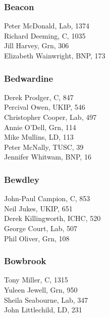\documentclass[a4paper,openany,10pt]{book}
\begin{document}
\subsubsection*{Beacon}



Peter McDonald, Lab, 1374\\
Richard Deeming, C, 1035\\
Jill Harvey, Grn, 306\\
Elizabeth Wainwright, BNP, 173\\


\subsubsection*{Bedwardine}



Derek Prodger, C, 847\\
Percival Owen, UKIP, 546\\
Christopher Cooper, Lab, 497\\
Annie O'Dell, Grn, 114\\
Mike Mullins, LD, 113\\
Peter McNally, TUSC, 39\\
Jennifer Whitwam, BNP, 16\\


\subsubsection*{Bewdley}



John-Paul Campion, C, 853\\
Neil Jukes, UKIP, 651\\
Derek Killingworth, ICHC, 520\\
George Court, Lab, 507\\
Phil Oliver, Grn, 108\\


\subsubsection*{Bowbrook}



Tony Miller, C, 1315\\
Yuleen Jewell, Grn, 950\\
Sheila Seabourne, Lab, 347\\
John Littlechild, LD, 231\\
\end{document}
